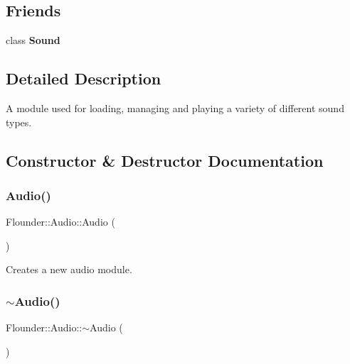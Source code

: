 \subsection*{Friends}
\begin{DoxyCompactItemize}
\item 
\mbox{\label{class_flounder_1_1_audio_a50914f77c7cf4fb97616c898c5291f4b}} 
class {\bfseries Sound}
\end{DoxyCompactItemize}


\subsection{Detailed Description}
A module used for loading, managing and playing a variety of different sound types. 



\subsection{Constructor \& Destructor Documentation}
\mbox{\label{class_flounder_1_1_audio_af1dab86461f65501f2e952da0d40c155}} 
\subsubsection{\texorpdfstring{Audio()}{Audio()}}
{\footnotesize\ttfamily Flounder\+::\+Audio\+::\+Audio (\begin{DoxyParamCaption}{ }\end{DoxyParamCaption})}



Creates a new audio module. 

\mbox{\label{class_flounder_1_1_audio_a188bc65130f76f1427451f2ff9dace31}} 
\subsubsection{\texorpdfstring{$\sim$\+Audio()}{~Audio()}}
{\footnotesize\ttfamily Flounder\+::\+Audio\+::$\sim$\+Audio (\begin{DoxyParamCaption}{ }\end{DoxyParamCaption})}



